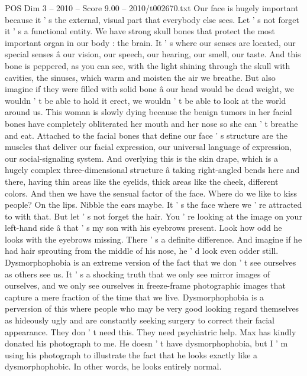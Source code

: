 \begin{textsample}{POS Dim 3 – 2010 – Score 9.00 – 2010/t002670.txt}  \label{ex:f3_pos_058}
Our face is hugely important because it ' s the external, visual part that everybody else sees.
Let ' s not forget it ' s a functional entity.
We have strong skull bones that protect the most important organ in our body : the brain.
It ' s where our senses are located, our special senses â our vision, our speech, our hearing, our smell, our taste.
And this bone is peppered, as you can see, with the light shining through the skull with cavities, the sinuses, which warm and moisten the air we breathe.
But also imagine if they were filled with solid bone â our head would be dead weight, we wouldn ' t be able to hold it erect, we wouldn ' t be able to look at the world around us.
This woman is slowly dying because the benign tumors in her facial bones have completely obliterated her mouth and her nose so she can ' t breathe and eat.
Attached to the facial bones that define our face ' s structure are the muscles that deliver our facial expression, our universal language of expression, our social-signaling system.
And overlying this is the skin drape, which is a hugely complex three-dimensional structure â taking right-angled bends here and there, having thin areas like the eyelids, thick areas like the cheek, different colors.
And then we have the sensual factor of the face.
Where do we like to kiss people?
On the lips.
Nibble the ears maybe.
It ' s the face where we ' re attracted to with that.
But let ' s not forget the hair.
You ' re looking at the image on your left-hand side â that ' s my son with his eyebrows present.
Look how odd he looks with the eyebrows missing.
There ' s a definite difference.
And imagine if he had hair sprouting from the middle of his nose, he ' d look even odder still.
Dysmorphophobia is an extreme version of the fact that we don ' t see ourselves as others see us.
It ' s a shocking truth that we only see mirror images of ourselves, and we only see ourselves in freeze-frame photographic images that capture a mere fraction of the time that we live.
Dysmorphophobia is a perversion of this where people who may be very good looking regard themselves as hideously ugly and are constantly seeking surgery to correct their facial appearance.
They don ' t need this.
They need psychiatric help.
Max has kindly donated his photograph to me.
He doesn ' t have dysmorphophobia, but I ' m using his photograph to illustrate the fact that he looks exactly like a dysmorphophobic.
In other words, he looks entirely normal.

\end{textsample}

